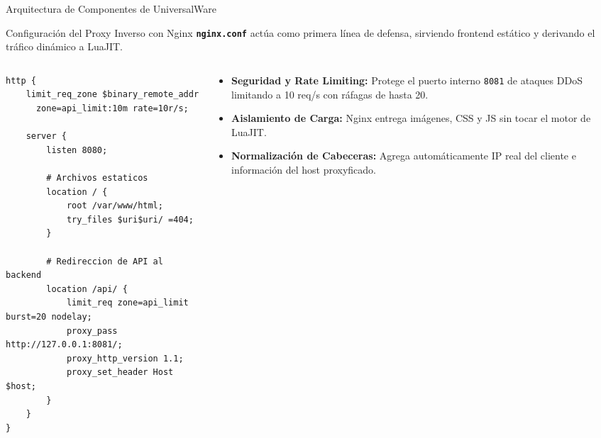 \documentclass[10pt,aspectratio=169]{beamer}
\begin{document}
\begin{frame}[fragile]{Arquitectura de Componentes de UniversalWare}
{
}
\end{frame}
\begin{frame}[fragile]{Configuración del Proxy Inverso con Nginx}
    \textbf{\texttt{nginx.conf}} actúa como primera línea de defensa, sirviendo frontend estático y derivando el tráfico dinámico a LuaJIT.

    \begin{columns}[T]
        \begin{column}{0.5\textwidth}
\begin{lstlisting}[style=shstyle, caption={Reglas principales de nginx.conf}]
http {
    limit_req_zone $binary_remote_addr 
      zone=api_limit:10m rate=10r/s;

    server {
        listen 8080;
        
        # Archivos estaticos
        location / {
            root /var/www/html;
            try_files $uri$uri/ =404;
        }

        # Redireccion de API al backend
        location /api/ {
            limit_req zone=api_limit burst=20 nodelay;
            proxy_pass http://127.0.0.1:8081/;
            proxy_http_version 1.1;
            proxy_set_header Host $host;
        }
    }
}
\end{lstlisting}
        \end{column}
        \begin{column}{0.48\textwidth}
            \begin{itemize}
                \item \textbf{Seguridad y Rate Limiting:} Protege el puerto interno \texttt{8081} de ataques DDoS limitando a 10 req/s con ráfagas de hasta 20.
                \item \textbf{Aislamiento de Carga:} Nginx entrega imágenes, CSS y JS sin tocar el motor de LuaJIT.
                \item \textbf{Normalización de Cabeceras:} Agrega automáticamente IP real del cliente e información del host proxyficado.
            \end{itemize}
        \end{column}
    \end{columns}
\end{frame}
\end{document}
